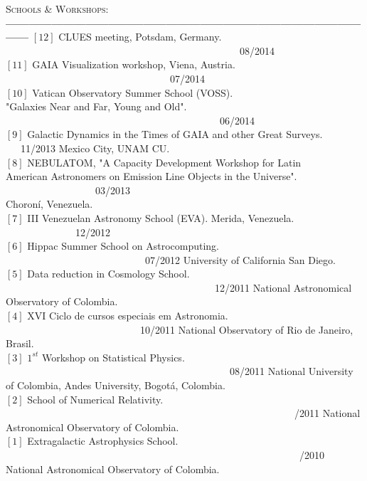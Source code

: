 \documentclass[letterpaper]{article}
\begin{document}
\textsc{\Large Schools \& Workshops:}\\
{\bf---------------------------------------------------------------------------------------------------}
$\left[12\right]$ CLUES meeting, Potsdam, Germany. \indent \ \ \ \ \ \ \ \ \ \ \ \ \ \ \ \ \ \ \ \ \ \ \ \ \ \ \ \ \ \ \ \ \ \ \ \ \ \ \ \ \ \ \ \ \ \ \ 08/2014\\
$\left[11\right]$ GAIA Visualization workshop, Viena, Austria. \indent \ \ \  \ \ \ \ \ \ \ \ \ \ \ \ \ \ \ \ \ \ \ \ \ \ \ \ \ \ \ \ \ \ 07/2014\\
$\left[10\right]$ Vatican Observatory Summer School (VOSS).\\
"Galaxies Near and Far, Young and Old". \indent \ \ \ \  \ \ \  \ \ \  \ \ \  \ \
 \ \ \ \ \ \ \ \ \ \ \ \ \ \ \ \ \ \ \ \ \ \ \ \ \ \ \ \ 06/2014 \\
$\left[9\right]$ Galactic Dynamics in the Times of GAIA and other Great Surveys. \indent \ \ \ 11/2013
Mexico City, UNAM CU.\\
$\left[8\right]$ \textsc{NEBULATOM}, "A Capacity Development Workshop for Latin\\
American Astronomers on Emission Line Objects in the Universe". \indent \ \ \ \ \ \ \ \ \ \ \ \ \ \ \ \ \ \ 03/2013 \\
Choron\'i, Venezuela.  \\
$\left[7\right]$ III Venezuelan Astronomy School (EVA). Merida, Venezuela. \indent \ \ \ \ \ \ \ \ \ \ \ \ \ \ 12/2012\\
$\left[6\right]$ Hippac Summer School on Astrocomputing. \indent \ \ \ \ \ \ \ \ \ \ \ \ \ \ \ \ \ \ \ \ \ \ \ \ \ \ \ \ 07/2012
University of California San Diego. \\
$\left[5\right]$ Data reduction in Cosmology School.  \indent \ \ \ \ \ \ \ \ \ \ \ \ \ \ \ \ \ \ \ \ \ \ \ \ \ \ \ \ \ \ \ \ \ \ \ \ \ \ \ \ \ \ 12/2011
National Astronomical Observatory of Colombia.\\
$\left[4\right]$ XVI Ciclo de cursos especiais em Astronomia.  \indent \ \ \ \ \ \ \ \ \ \ \ \ \ \ \ \ \ \ \ \ \ \ \ \ \ \ \ 10/2011
National Observatory of Rio de Janeiro, Brasil. \\
$\left[3\right]$ $1^{st}$ Workshop on Statistical Physics. \indent \ \ \ \ \ \ \ \ \ \ \ \ \ \ \ \ \ \ \ \ \ \ \ \ \ \ \ \ \ \ \ \ \ \ \ \ \ \ \ \ \ \ \ \ \ 08/2011
National University of Colombia, Andes University, Bogot\'{a}, Colombia. \\
$\left[2\right]$ School of Numerical Relativity. \indent \ \ \ \ \ \ \ \ \ \ \ \ \ \ \ \ \ \ \ \ \ \ \ \ \ \ \ \ \ \ \ \ \ \ \ \ \ \ \ \ \ \ \ \ \ \ \ \ \ \ \ \ \ \ \ \ \ \ /2011
National Astronomical Observatory of Colombia.\\
$\left[1\right]$ Extragalactic Astrophysics School. \indent \ \ \ \ \ \ \ \ \ \ \ \ \ \ \ \ \ \ \ \ \ \ \ \ \ \ \ \ \ \ \ \ \ \ \ \ \ \ \ \ \ \ \ \ \ \ \ \ \ \ \ \ \ \ \ \ \ \ \ /2010
National Astronomical Observatory of Colombia.\\
\end{document}
